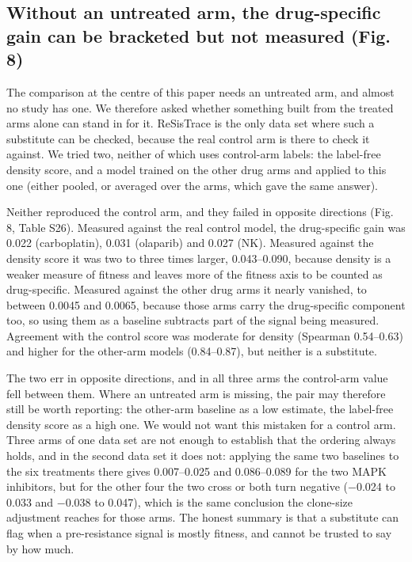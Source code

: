\documentclass[11pt,a4paper]{article}
\begin{document}
\subsection*{Without an untreated arm, the drug-specific gain can be bracketed but not measured (Fig. 8)}

The comparison at the centre of this paper needs an untreated arm, and almost no study has one. We therefore asked whether something built from the treated arms alone can stand in for it. ReSisTrace is the only data set where such a substitute can be checked, because the real control arm is there to check it against. We tried two, neither of which uses control-arm labels: the label-free density score, and a model trained on the other drug arms and applied to this one (either pooled, or averaged over the arms, which gave the same answer).

Neither reproduced the control arm, and they failed in opposite directions (Fig. 8, Table S26). Measured against the real control model, the drug-specific gain was 0.022 (carboplatin), 0.031 (olaparib) and 0.027 (NK). Measured against the density score it was two to three times larger, 0.043--0.090, because density is a weaker measure of fitness and leaves more of the fitness axis to be counted as drug-specific. Measured against the other drug arms it nearly vanished, to between 0.0045 and 0.0065, because those arms carry the drug-specific component too, so using them as a baseline subtracts part of the signal being measured. Agreement with the control score was moderate for density (Spearman 0.54--0.63) and higher for the other-arm models (0.84--0.87), but neither is a substitute.

The two err in opposite directions, and in all three arms the control-arm value fell between them. Where an untreated arm is missing, the pair may therefore still be worth reporting: the other-arm baseline as a low estimate, the label-free density score as a high one. We would not want this mistaken for a control arm. Three arms of one data set are not enough to establish that the ordering always holds, and in the second data set it does not: applying the same two baselines to the six treatments there gives 0.007--0.025 and 0.086--0.089 for the two MAPK inhibitors, but for the other four the two cross or both turn negative ($-$0.024 to 0.033 and $-$0.038 to 0.047), which is the same conclusion the clone-size adjustment reaches for those arms. The honest summary is that a substitute can flag when a pre-resistance signal is mostly fitness, and cannot be trusted to say by how much.
\end{document}
